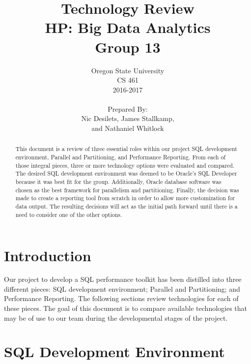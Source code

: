 \documentclass[draftclsnofoot, onecolumn, compsoc, 10pt]{IEEEtran}
\title{\Huge Technology Review\\\large HP: Big Data Analytics\\Group 13}
\author{Oregon State University\\CS 461\\2016-2017\\\\Prepared By:\\Nic Desilets, James Stallkamp,\\and Nathaniel Whitlock}
\begin{document}
\begin{titlingpage}
    \maketitle 
    
    \vspace{1in}
    \begin{abstract}
		\noindent This document is a review of three essential roles within our project SQL development environment, Parallel and Partitioning, and Performance Reporting.
        From each of those integral pieces, three or more technology options were evaluated and compared.
        The desired SQL development environment was deemed to be Oracle's SQL Developer because it was best fit for the group.
        Additionally, Oracle database software was chosen as the best framework for parallelism and partitioning.
        Finally, the decision was made to create a reporting tool from scratch in order to allow more customization for data output.
        The resulting decisions will act as the initial path forward until there is a need to consider one of the other options.
    \end{abstract}
\end{titlingpage}

\tableofcontents

\section{Introduction}
Our project to develop a SQL performance toolkit has been distilled into three different pieces: SQL development environment; Parallel and Partitioning; and Performance Reporting. The following sections review technologies for each of these pieces. The goal of this document is to compare available technologies that may be of use to our team during the developmental stages of the project.


\section{SQL Development Environment}
\end{document}
